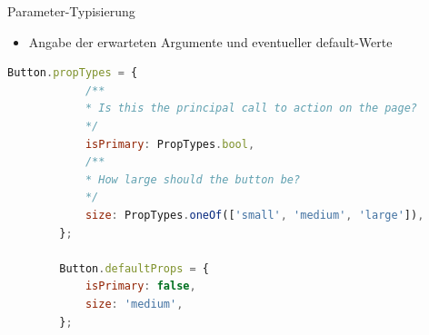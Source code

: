 \documentclass{beamer}
\begin{document}
\begin{frame}[fragile]{Parameter-Typisierung}
	\begin{itemize}
		\item Angabe der erwarteten Argumente und eventueller default-Werte
	\end{itemize}
	\begin{lstlisting}[language=JavaScript]
		Button.propTypes = {
			/**
			* Is this the principal call to action on the page?
			*/
			isPrimary: PropTypes.bool,
			/**
			* How large should the button be?
			*/
			size: PropTypes.oneOf(['small', 'medium', 'large']),
		};
	
		Button.defaultProps = {
			isPrimary: false,
			size: 'medium',
		};
	\end{lstlisting}
\end{frame}

\end{document}
